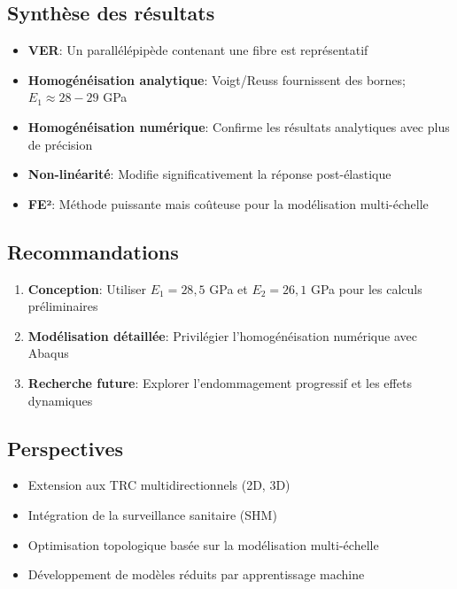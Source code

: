 \documentclass{rapportECL}
\begin{document}
\subsection{Synthèse des résultats}

\begin{itemize}
\item \textbf{VER}: Un parallélépipède contenant une fibre est représentatif
\item \textbf{Homogénéisation analytique}: Voigt/Reuss fournissent des bornes; $E_1 \approx 28-29$ GPa
\item \textbf{Homogénéisation numérique}: Confirme les résultats analytiques avec plus de précision
\item \textbf{Non-linéarité}: Modifie significativement la réponse post-élastique
\item \textbf{FE²}: Méthode puissante mais coûteuse pour la modélisation multi-échelle
\end{itemize}

\subsection{Recommandations}

\begin{enumerate}
\item \textbf{Conception}: Utiliser $E_1 = 28,5$ GPa et $E_2 = 26,1$ GPa pour les calculs préliminaires
\item \textbf{Modélisation détaillée}: Privilégier l'homogénéisation numérique avec Abaqus
\item \textbf{Recherche future}: Explorer l'endommagement progressif et les effets dynamiques
\end{enumerate}

\subsection{Perspectives}

\begin{itemize}
\item Extension aux TRC multidirectionnels (2D, 3D)
\item Intégration de la surveillance sanitaire (SHM) \cite{Yosef2021}
\item Optimisation topologique basée sur la modélisation multi-échelle
\item Développement de modèles réduits par apprentissage machine
\end{itemize}
\end{document}
